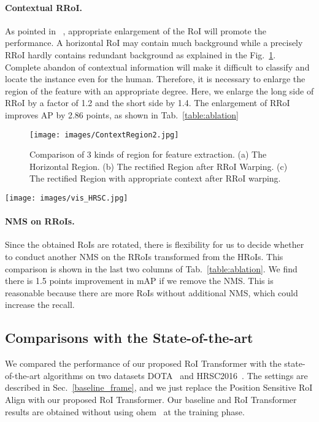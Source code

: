 \documentclass[11pt,onecolumn]{article}         \usepackage[top=3.6cm, bottom=3.2cm, left=2.3cm, right=2.3cm]{geometry}
\begin{document}
\paragraph{Contextual RRoI.}
As pointed in ~\cite{tinyfaces, RRPN}, appropriate enlargement of the RoI will promote the performance. A horizontal RoI may contain much background while a precisely RRoI hardly contains redundant background as explained in the Fig.~\ref{fig:ContextRegion}. Complete abandon of contextual information will make it difficult to classify and locate the instance even for the human. Therefore, it is necessary to enlarge the region of the feature with an appropriate degree. Here, we enlarge the long side of RRoI by a factor of 1.2 and the short side by 1.4. The enlargement of RRoI improves AP by 2.86 points, as shown in Tab.~\ref{table:ablation}

\begin{figure}[t!]
    \centering
    \texttt{[image: images/ContextRegion2.jpg]}
    \vspace{-2mm}
    \caption{Comparison of 3 kinds of region for feature extraction.
 (a) The Horizontal Region. (b) The rectified Region after RRoI Warping. (c) The rectified Region with appropriate context after RRoI warping. 
    }
    \label{fig:ContextRegion}
\end{figure}
\begin{figure*}[ht!]
    \centering
    \texttt{[image: images/vis\_HRSC.jpg]}
\caption{{\bf Visualization of detection results from RoI Transformer in HRSC2016}. We select the predicted bounding boxes with scores above 0.1, and a NMS with threshold 0.1 is applied for duplicate removal.
    }
    \label{fig:vis_HRSC}
\end{figure*}

\paragraph{NMS on RRoIs.}Since the obtained RoIs are rotated, there is flexibility for us to decide whether to conduct another NMS on the RRoIs transformed from the HRoIs. This comparison is shown in the last two columns of Tab.~\ref{table:ablation}. We find there is  1.5 points improvement in mAP if we remove the NMS. This is reasonable because there are more RoIs without additional NMS, which could increase the recall.



\subsection{Comparisons with the State-of-the-art}
We compared the performance of our proposed RoI Transformer with the state-of-the-art algorithms on two datasets DOTA~\cite{DOTA} and HRSC2016~\cite{HRSC2016}. The settings are described in Sec.~\ref{baseline_frame}, and we just replace the Position Sensitive RoI Align with our proposed RoI Transformer. Our baseline and RoI Transformer results are obtained without using ohem~\cite{ohem} at the training phase.
\end{document}
